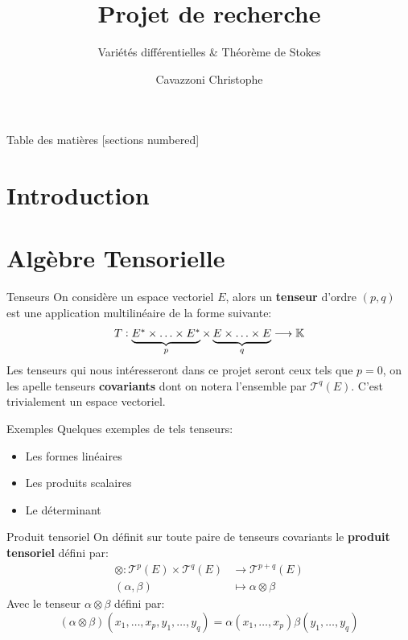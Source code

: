 \documentclass{beamer}
\title{Projet de recherche}
\subtitle{Variétés différentielles \& Théorème de Stokes}
\author{Cavazzoni Christophe}
\begin{document}
    \begin{frame}
        \titlepage
    \end{frame}
    \begin{frame}{Table des matières}
        [sections numbered]
        \tableofcontents
    \end{frame}
    
    \section{Introduction}
    \section{Algèbre Tensorielle}
        \begin{frame}{Tenseurs}
            On considère un espace vectoriel $E$, alors un \textbf{tenseur} d'ordre $(p, q)$ est une application multilinéaire de la forme suivante:
            $$
                T : \underbrace{\addstackgap[1pt]{$E^* \times \ldots \times E^*$}}_\text{$p$} \times \underbrace{\addstackgap[1pt]{$E \times \ldots \times E$}}_\text{$q$} \longrightarrow \mathbb{K}
            $$
            Les tenseurs qui nous intéresseront dans ce projet seront ceux tels que $p = 0$, on les apelle tenseurs \textbf{covariants} dont on notera l'ensemble par $\mathscr{T}^q(E)$. C'est trivialement un espace vectoriel.
        \end{frame}
        \begin{frame}{Exemples}
            Quelques exemples de tels tenseurs:
            \begin{itemize}
                \item Les formes linéaires
                \item Les produits scalaires
                \item Le déterminant
            \end{itemize}
        \end{frame}
        \begin{frame}{Produit tensoriel}
            On définit sur toute paire de tenseurs covariants le \textbf{produit tensoriel} défini par:
            \begin{align*}
                \otimes : \mathscr{T}^p(E) \times \mathscr{T}^q(E) &\longrightarrow \mathscr{T}^{p+q}(E)\\
                (\alpha, \beta) &\longmapsto \alpha \otimes \beta
            \end{align*}
            Avec le tenseur \(\alpha \otimes \beta\) défini par:
            \[
                (\alpha \otimes \beta)(x_1, \ldots, x_p, y_1, \ldots, y_q) = \alpha(x_1, \ldots, x_p)\beta(y_1, \ldots, y_q)
            \]
        \end{frame}
\end{document}
